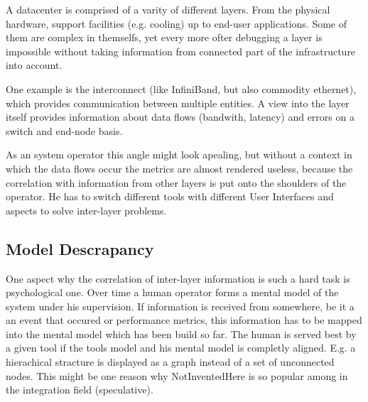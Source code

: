 A datacenter is comprised of a varity of different layers. From the physical hardware, support facilities (e.g. cooling) up to end-user applications.
Some of them are complex in themselfs, yet every more ofter debugging a layer is impossible without taking information from connected part of the infrastructure into account.

One example is the interconnect (like InfiniBand, but also commodity ethernet), which provides communication between multiple
entities. A view into the layer itself provides information about data flows (bandwith, latency) and errors on a switch and end-node basis.

As an system operator this angle might look apealing, but without a context in which the data flows occur the metrics are almost rendered useless, because
the correlation with information from other layers is put onto the shoulders of the operator.
He has to switch different tools with different User Interfaces and aspects to solve inter-layer problems.
\subsection{Model Descrapancy}
One aspect why the correlation of inter-layer information is such a hard task is psychological one. Over time a human operator forms a mental model
of the system under his supervision. If information is received from somewhere, be it a an event that occured or performance metrics, this information
has to be mapped into the mental model which has been build so far.
The human is served best by a given tool if the tools model and his mental model is completly aligned.
E.g. a hierachical stracture is displayed as a graph instead of a set of unconnected nodes. This might be one reason why NotInventedHere
is so popular among in the integration field (speculative).


